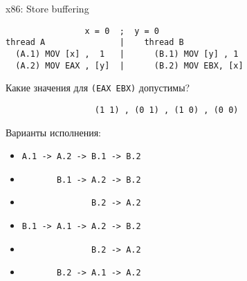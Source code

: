 \begin{frame}{x86: Store buffering}

\begin{adjustbox}{width=\textwidth,height=2cm,keepaspectratio}
\begin{lstlisting}
                x = 0  ;  y = 0
thread A               |    thread B          
  (A.1) MOV [x] ,  1   |      (B.1) MOV [y] , 1  
  (A.2) MOV EAX , [y]  |      (B.2) MOV EBX, [x] 
\end{lstlisting}
\end{adjustbox}

\pause
Какие значения для \texttt{(EAX EBX)} допустимы?

\texttt{\ \ \ \ \ \ \ \ \ \ \ \ \ \ \ \ \ \ (1 1)\ , (0 1)\ , (1 0)\ , (0 0)}

\pause
Варианты исполнения:
\begin{itemize}
    \item \texttt{A.1 -> A.2 -> B.1 -> B.2}
    \item \texttt{\ \ \ \ \ \ \       B.1 -> A.2 -> B.2}
    \item \texttt{\ \ \ \ \ \ \ \ \ \ \ \ \ \              B.2 -> A.2}
    \item \texttt{B.1 -> A.1 -> A.2 -> B.2}
    \item \texttt{\ \ \ \ \ \ \ \ \ \ \ \ \ \              B.2 -> A.2}
    \item \texttt{\ \ \ \ \ \ \       B.2 -> A.1 -> A.2}
\end{itemize}
\end{frame}

